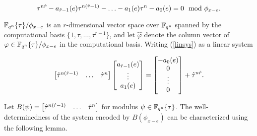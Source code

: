 \begin{equation}\label{linsys}
\tau^{n\hat{r}} - a_{\hat{r}-1}(e)\tau^{n(\hat{r}-1)} - \ldots - a_1(e)\tau^n - a_0(e)  = 0 \mod \phi_{x - e}.
\end{equation}

$\mathbb{F}_{q^n}\{\tau \}/\phi_{x-e}$ is an $r$-dimensional vector space over $\mathbb{F}_{q^n}$ spanned by the computational basis $\{1, \tau, \ldots, \tau^{r-1}\}$, and let $\hat{\varphi}$ denote the column vector of $\varphi \in \mathbb{F}_{q^n}\{\tau \}/\phi_{x-e}$ in the computational basis. Writing (\ref{linsys}) as a linear system

\begin{equation}\label{system1} \begin{bmatrix} \hat{\tau}^{n(\hat{r}-1)} & \ldots & \hat{\tau}^{n} \end{bmatrix} \begin{bmatrix} a_{\hat{r}-1}(e) \\ \vdots \\ a_1(e) \end{bmatrix} = \begin{bmatrix}  -a_0(e) \\ 0 \\ \vdots \\ 0  \end{bmatrix} + \hat{\tau}^{n\hat{r}}.
\end{equation}

Let $ B(\psi) = \begin{bmatrix} \hat{\tau}^{n(\hat{r}-1)} & \ldots & \hat{\tau}^{n} \end{bmatrix}$ for modulus $\psi \in \mathbb{F}_{q^n}\{\tau\}$. The well-determinedness of the system encoded by $B(\phi_{x-e})$ can be characterized using the following lemma.



